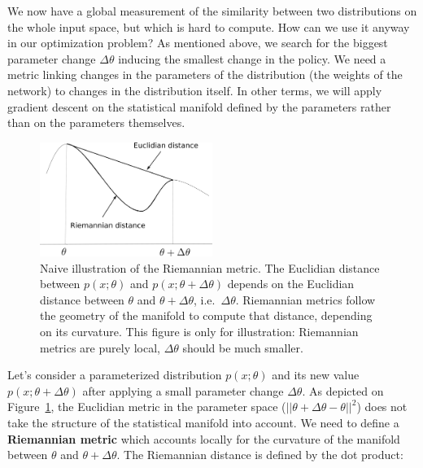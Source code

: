 \documentclass[
  letterpaper,
  DIV=11,
  numbers=noendperiod]{scrreprt}
\begin{document}
We now have a global measurement of the similarity between two
distributions on the whole input space, but which is hard to compute.
How can we use it anyway in our optimization problem? As mentioned
above, we search for the biggest parameter change \(\Delta \theta\)
inducing the smallest change in the policy. We need a metric linking
changes in the parameters of the distribution (the weights of the
network) to changes in the distribution itself. In other terms, we will
apply gradient descent on the statistical manifold defined by the
parameters rather than on the parameters themselves.

\begin{figure}

{\centering \includegraphics[width=0.5\textwidth,height=\textheight]{./img/riemannian.png}

}

\caption{\label{fig-riemannian}Naive illustration of the Riemannian
metric. The Euclidian distance between \(p(x; \theta)\) and
\(p(x; \theta + \Delta \theta)\) depends on the Euclidian distance
between \(\theta\) and \(\theta + \Delta\theta\),
i.e.~\(\Delta \theta\). Riemannian metrics follow the geometry of the
manifold to compute that distance, depending on its curvature. This
figure is only for illustration: Riemannian metrics are purely local,
\(\Delta \theta\) should be much smaller.}

\end{figure}

Let's consider a parameterized distribution \(p(x; \theta)\) and its new
value \(p(x; \theta + \Delta \theta)\) after applying a small parameter
change \(\Delta \theta\). As depicted on Figure~\ref{fig-riemannian},
the Euclidian metric in the parameter space
(\(||\theta + \Delta \theta - \theta||^2\)) does not take the structure
of the statistical manifold into account. We need to define a
\textbf{Riemannian metric} which accounts locally for the curvature of
the manifold between \(\theta\) and \(\theta + \Delta \theta\). The
Riemannian distance is defined by the dot product:
\end{document}
